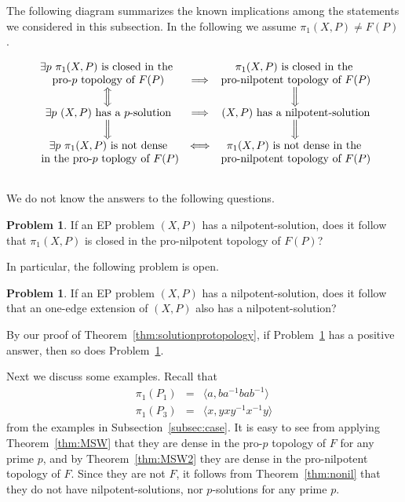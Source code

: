 \documentclass[11pt]{amsart}
\theoremstyle{definition}
\newtheorem{problem}[theorem]{Problem}
\theoremstyle{definition}
\numberwithin{equation}{section}
\begin{document}
The following diagram summarizes the known implications among the statements we considered in this subsection. In the following we assume $\pi_1(X, P)\neq F(P)$.

$$
\begin{array}{ccc}
\mbox{$\exists p$ $\pi_1(X, P)$ is closed in the } & &  \mbox{$\pi_1(X, P)$ is closed in the } \\
\mbox{pro-$p$ topology of $F(P)$} & \Longrightarrow & \mbox{pro-nilpotent topology of $F(P)$} \\
\displaystyle\left\Updownarrow\vphantom{\sum}\right. & & \displaystyle\left\Downarrow\vphantom{\sum}\right. \\
\mbox{$\exists p$ $(X, P)$ has a $p$-solution} & \Longrightarrow & \mbox{$(X, P)$ has a nilpotent-solution} \\
\displaystyle\left\Downarrow\vphantom{\sum}\right. & & \displaystyle\left\Downarrow\vphantom{\sum}\right. \\
\mbox{$\exists p$ $\pi_1(X, P)$ is not dense} & \Longleftrightarrow & \mbox{$\pi_1(X, P)$ is not dense in the } \\
\mbox{ in the pro-$p$ toplogy of $F(P)$} & & \mbox{pro-nilpotent topology of $F(P)$} \\ \\
\end{array}
$$

We do not know the answers to the following questions.

\begin{problem}\label{prob:nil} If an EP problem $(X, P)$ has a nilpotent-solution, does it follow that $\pi_1(X, P)$ is closed in the pro-nilpotent topology of $F(P)$?
\end{problem}

In particular, the following problem is open.

\begin{problem}\label{prob:ope} If an EP problem $(X, P)$ has a nilpotent-solution, does it follow that an one-edge extension of $(X, P)$ also has a nilpotent-solution?
\end{problem}

By our proof of Theorem~\ref{thm:solutionprotopology}, if Problem~\ref{prob:ope} has a positive answer, then so does Problem~\ref{prob:nil}.

Next we discuss some examples. Recall that
$$ \begin{array}{rcl}
\pi_1(P_1)\!\!\!&=&\!\!\! \langle a, ba^{-1}bab^{-1}\rangle \\
\pi_1(P_3)\!\!\!&=&\!\!\! \langle x, yxy^{-1}x^{-1}y\rangle  
\end{array}
$$
from the examples in Subsection~\ref{subsec:case}. It is easy to see from applying Theorem~\ref{thm:MSW} that they are dense in the pro-$p$ topology of $F$ for any prime $p$, and by Theorem~\ref{thm:MSW2} they are dense in the pro-nilpotent topology of $F$. Since they are not $F$, it follows from Theorem~\ref{thm:nonil} that they do not have nilpotent-solutions, nor $p$-solutions for any prime $p$. 
\end{document}
